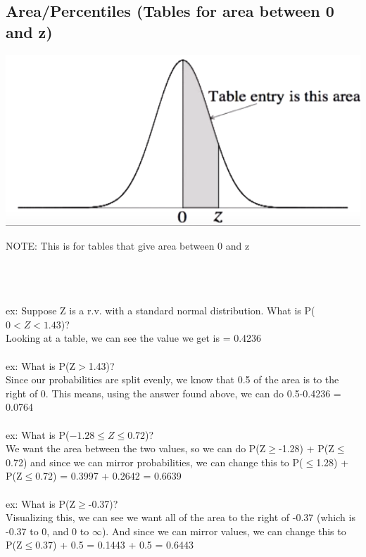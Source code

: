 \documentclass[12pt, a4paper]{article}
\begin{document}
	\subsection{Area/Percentiles (Tables for area between 0 and z)}
	\begin{minipage}[c]{8.5cm}
		\includegraphics[scale=.45]{betwn} \\
	\end{minipage}
	\begin{minipage}[c]{6cm}
		NOTE: This is for tables that give area between 0 and z \\~\\
	\end{minipage} \\~\\
	ex: Suppose Z is a r.v. with a standard normal distribution. What is P($0<Z<1.43$)? \\
	Looking at a table, we can see the value we get is = 0.4236 \\~\\
	ex: What is P(Z$>$1.43)? \\
	Since our probabilities are split evenly, we know that 0.5 of the area is to the right of 0. This means, using the answer found above, we can do 0.5-0.4236 = 0.0764 \\~\\
	ex: What is P($-1.28\leq Z \leq 0.72$)? \\
	We want the area between the two values, so we can do P(Z$\geq$-1.28) + P(Z$\leq$0.72) and since we can mirror probabilities, we can change this to P($\leq$1.28) + P(Z$\leq$0.72) = 0.3997 + 0.2642 = 0.6639 \\~\\
	ex: What is P(Z$\geq$-0.37)? \\
	Visualizing this, we can see we want all of the area to the right of -0.37 (which is -0.37 to 0, and 0 to $\infty$). And since we can mirror values, we can change this to P(Z$\leq$0.37) + 0.5 = 0.1443 + 0.5 = 0.6443 \\~\\
\end{document}
